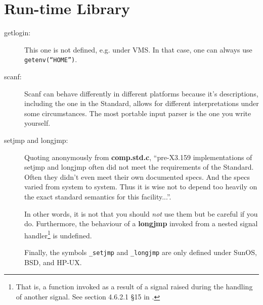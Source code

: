 \section{Run-time Library}


\begin{description}

\item[getlogin:] This one is not defined, e.g. under VMS.
 In that case, one can always use {\tt getenv(``HOME'')}.

\item[scanf:] Scanf can behave differently in different platforms because
 it's descriptions, including the one in the Standard, allows for different
 interpretations under some circumstances. The most portable input parser
 is the one you write yourself.

\item[setjmp and longjmp:] Quoting anonymously
 from {\bf comp.std.c}, ``pre-X3.159 implementations of
setjmp and longjmp often did not meet the requirements of the Standard. Often
they didn't even meet their own documented specs. And the specs varied
from system to system. Thus it is wise not to depend too heavily on the
exact standard semantics for this facility...''.

In other words, it is not that you should {\em not} use them but
be careful if you do. Furthermore, the behaviour of a {\bf longjmp}
invoked from a nested signal handler\footnote{That is, a function invoked
as a result of a signal raised during the handling of another signal.
See section 4.6.2.1 \S 15 in \cite{kn:ansi}.}
is undefined.

Finally, the symbols {\tt \_setjmp} and {\tt \_longjmp} are only defined
under SunOS, BSD, and HP-UX.

\end{description}

